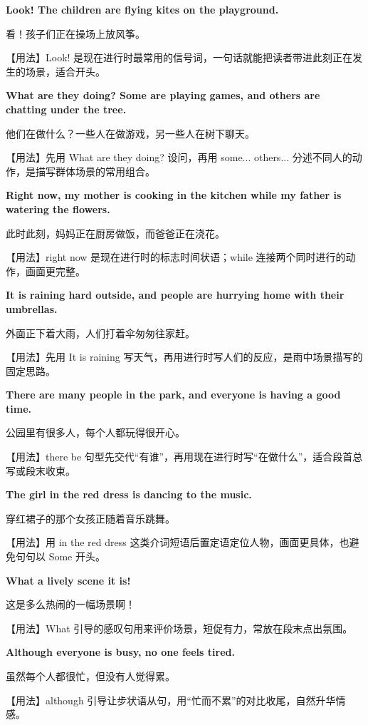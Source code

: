 \documentclass[UTF8,a4paper,11pt,oneside]{ctexbook}
\newcommand{\fansection}[1]{%
  \par\addvspace{2.4ex}%
  \Needspace{6\baselineskip}%
  \noindent{\sffamily\Large\bfseries\color{mainblue}#1}\par
  \nopagebreak
  \addvspace{0.2ex}%
  \noindent{\color{rulelight}\rule{\linewidth}{0.9pt}}\par
  \addvspace{0.9ex}%
  \nobreak
}
\newcommand{\fanpat}[3]{%
  \item{\bfseries #1}\par\nopagebreak
  {\small\color{textgray}#2}\par\nopagebreak
  {\footnotesize\color{accent!90!black}【用法】#3}\par
}
\begin{document}
\fansection{〇、本单元写作常用句型}
\begin{fanpatterns}
\fanpat{Look! The children are flying kites on the playground.}{看！孩子们正在操场上放风筝。}{Look! 是现在进行时最常用的信号词，一句话就能把读者带进此刻正在发生的场景，适合开头。}

\fanpat{What are they doing? Some are playing games, and others are chatting under the tree.}{他们在做什么？一些人在做游戏，另一些人在树下聊天。}{先用 What are they doing? 设问，再用 some... others... 分述不同人的动作，是描写群体场景的常用组合。}

\fanpat{Right now, my mother is cooking in the kitchen while my father is watering the flowers.}{此时此刻，妈妈正在厨房做饭，而爸爸正在浇花。}{right now 是现在进行时的标志时间状语；while 连接两个同时进行的动作，画面更完整。}

\fanpat{It is raining hard outside, and people are hurrying home with their umbrellas.}{外面正下着大雨，人们打着伞匆匆往家赶。}{先用 It is raining 写天气，再用进行时写人们的反应，是雨中场景描写的固定思路。}

\fanpat{There are many people in the park, and everyone is having a good time.}{公园里有很多人，每个人都玩得很开心。}{there be 句型先交代“有谁”，再用现在进行时写“在做什么”，适合段首总写或段末收束。}

\fanpat{The girl in the red dress is dancing to the music.}{穿红裙子的那个女孩正随着音乐跳舞。}{用 in the red dress 这类介词短语后置定语定位人物，画面更具体，也避免句句以 Some 开头。}

\fanpat{What a lively scene it is!}{这是多么热闹的一幅场景啊！}{What 引导的感叹句用来评价场景，短促有力，常放在段末点出氛围。}

\fanpat{Although everyone is busy, no one feels tired.}{虽然每个人都很忙，但没有人觉得累。}{although 引导让步状语从句，用“忙而不累”的对比收尾，自然升华情感。}

\end{fanpatterns}

\fansection{一、满分范文}
\end{document}
